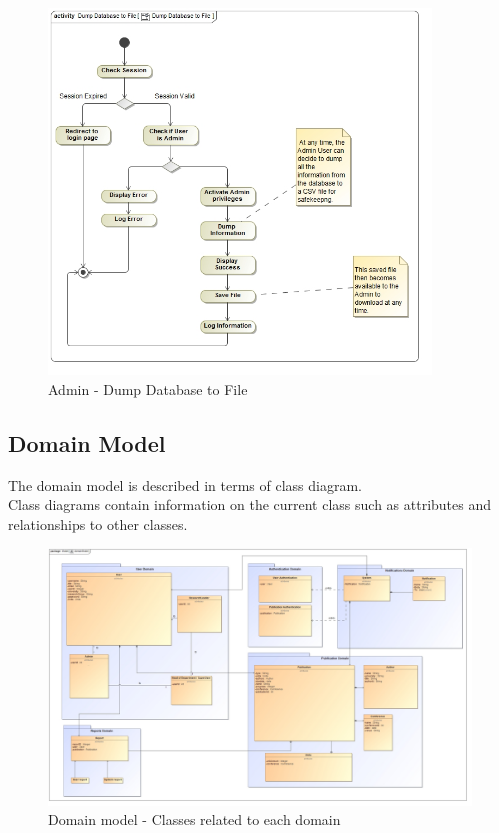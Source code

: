 \documentclass{article}
\begin{document}
			\begin{figure}[H]
				\includegraphics[width=4in, center]{../Diagrams/Process Specifications/act__Dump_Database_to_File__Dump_Database_to_File.jpg}
				\caption{Admin - Dump Database to File}
			\end{figure}
			
		
		\subsection{Domain Model}\label{subsec:domainmodel}
		The domain model is described in terms of class diagram.\\ Class diagrams contain information on the current class such as attributes and relationships to other classes.
			\begin{figure}[h]				
				\includegraphics[width=\linewidth]{../Diagrams/Domain Model/domainModel.jpg}
				\caption{ Domain model - Classes related to each domain }
			\end{figure}
			
\end{document}
